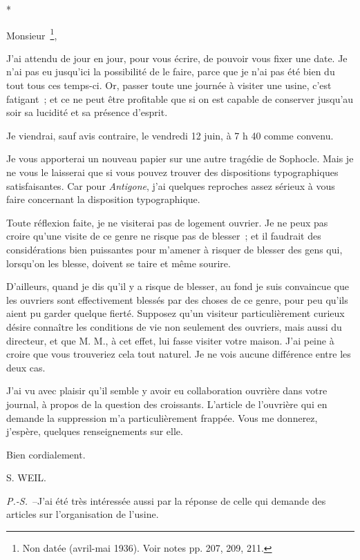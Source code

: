 \documentclass[french,twoside]{book} %
\begin{document}
\begin{center}
*\end{center}
\noindent Monsieur \footnote{Non datée (avril-mai 1936). Voir notes pp. 207, 209, 211.},\par
J'ai attendu de jour en jour, pour vous écrire, de pouvoir vous fixer une date. Je n'ai pas eu jusqu'ici la possibilité de le faire, parce que je n'ai pas été bien du tout tous ces temps-ci. Or, passer toute une journée à visiter une usine, c'est fatigant ; et ce ne peut être profitable que si on est capable de conserver jusqu'au soir sa lucidité et sa présence d'esprit.\par
Je viendrai, sauf avis contraire, le vendredi 12 juin, à 7 h 40 comme convenu.\par
Je vous apporterai un nouveau papier sur une autre tragédie de Sophocle. Mais je ne vous le laisserai que si vous pouvez trouver des dispositions typographiques satisfaisantes. Car pour {\itshape Antigone}, j'ai quelques reproches assez sérieux à vous faire concernant la disposition typographique.\par
Toute réflexion faite, je ne visiterai pas de logement ouvrier. Je ne peux pas croire qu'une visite de ce genre ne risque pas de blesser ; et il faudrait des considérations bien puissantes pour m'amener à risquer de blesser des gens qui, lorsqu'on les blesse, doivent se taire et même sourire.\par
D'ailleurs, quand je dis qu'il y a risque de blesser, au fond je suis convaincue que les ouvriers sont effectivement blessés par des choses de ce genre, pour peu qu'ils aient pu garder quelque fierté. Supposez qu'un visiteur particulièrement curieux désire connaître les conditions de vie non seulement des ouvriers, mais aussi du directeur, et que M. M., à cet effet, lui fasse visiter votre maison. J'ai peine à croire que vous trouveriez cela tout naturel. Je ne vois aucune différence entre les deux cas.\par
\par
J'ai vu avec plaisir qu'il semble y avoir eu collaboration ouvrière dans votre journal, à propos de la question des croissants. L'article de l'ouvrière qui en demande la suppression m'a particulièrement frappée. Vous me donnerez, j'espère, quelques renseignements sur elle.\par
Bien cordialement.\par
S. WEIL.\par
{\itshape P.-S.} –J'ai été très intéressée aussi par la réponse de celle qui demande des articles sur l'organisation de l'usine.\par
\end{document}
